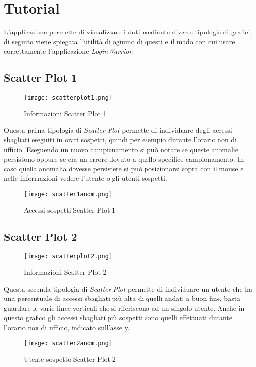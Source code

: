\chapter{Tutorial}
L'applicazione permette di visualizzare i dati mediante diverse tipologie di grafici, di seguito viene spiegata l'utilità di ognuno di questi e il modo con cui usare correttamente l'applicazione \textit{LoginWarrior}.

\section{Scatter Plot 1}
\begin{figure}[H]
	\centering
	\texttt{[image: scatterplot1.png]}
	\caption{Informazioni Scatter Plot 1}
  \end{figure}
Questa prima tipologia di \textit{Scatter Plot} permette di individuare degli accessi sbagliati eseguiti in orari sospetti, quindi per esempio durante l'orario non di ufficio. Eseguendo un nuovo campionamento si può notare se queste anomalie persistono oppure se era un errore dovuto a quello specifico campionamento. In caso quella anomalia dovesse persistere si può posizionarsi sopra con il mouse e nelle informazioni vedere l'utente o gli utenti sospetti.
\begin{figure}[H]
	\centering
	\texttt{[image: scatter1anom.png]}
	\caption{Accessi sospetti Scatter Plot 1}
  \end{figure}
\section{Scatter Plot 2}
\begin{figure}[H]
	\centering
	\texttt{[image: scatterplot2.png]}
	\caption{Informazioni Scatter Plot 2}
  \end{figure}
Questa seconda tipologia di \textit{Scatter Plot} permette di individuare un utente che ha una percentuale di accessi sbagliati più alta di quelli andati a buon fine, basta guardare le varie linee verticali che si riferiscono ad un singolo utente. Anche in questo grafico gli accessi sbagliati più sospetti sono quelli effettuati durante l'orario non di ufficio, indicato sull'asse y.
\begin{figure}[H]
	\centering
	\texttt{[image: scatter2anom.png]}
	\caption{Utente sospetto Scatter Plot 2}
  \end{figure}
